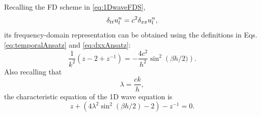 {{Recalling the FD scheme in \eqref{eq:1DwaveFDS},
\begin{equation*}
    \delta_{tt} u_l^n = c^2 \delta_{xx} u_l^n,
\end{equation*}
its frequency-domain representation can be obtained using the definitions in Eqs. \eqref{eq:temporalAnsatz} and \eqref{eq:dxxAnsatz}:
\begin{equation}
    \frac{1}{k^2}\left(z - 2 + z^{-1}\right) = -\frac{4c^2}{h^2}\sin^2\left(\beta h / 2)\right).
\end{equation}
Also recalling that
\begin{equation*}
    \lambda = \frac{ck}{h},
\end{equation*}
the characteristic equation of the 1D wave equation is
\begin{equation}\label{eq:1dWaveCharacteristic}
    z + \left(4\lambda^2\sin^2(\beta h / 2) -2\right) - z^{-1} = 0.
\end{equation}
}}

